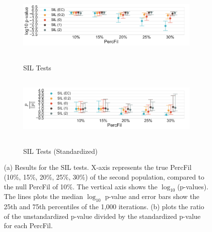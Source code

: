 \documentclass[12pt]{article}
\begin{document}
\begin{figure}[htp!]
  \centering
  \begin{subfigure}{.75\textwidth}
    \centering
    \caption{SIL Tests}
    \includegraphics[height = 1.25in]{figure_8_silhouette_group.pdf}
    \label{fig:sub_silh}
  \end{subfigure}
  \begin{subfigure}{.75\textwidth}
    \centering
    \caption{SIL Tests (Standardized)}
    \includegraphics[height = 1.25in]{figure_8_joint_silhouette_group.pdf}
    \label{fig:sub_silh_normed}
  \end{subfigure}
\label{fig:sub_silh_results}
\caption{(a) Results for the SIL tests. X-axis represents the true PercFil (10\%, 15\%, 20\%, 25\%, 30\%) of the second population, compared to the null PercFil of 10\%. The vertical axis shows the $\log_{10}$(p-values). The lines plots the median $\log_{10}$ p-value and error bars show the 25th and 75th percentiles of the 1,000 iterations. (b) plots the ratio of the unstandardized p-value divided by the standardized p-value for each PercFil. }

\end{figure}
\end{document}

